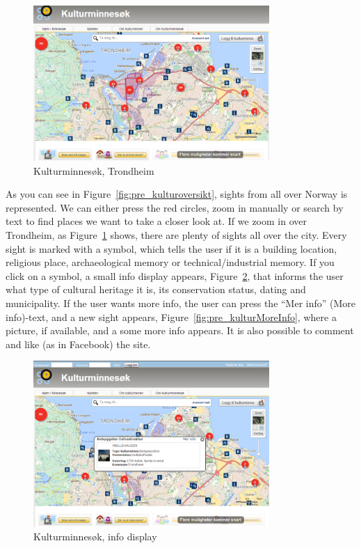 \documentclass[11pt]{book}
\begin{document}
\begin{figure}[H]
      \centering
      \includegraphics[width=0.8\textwidth]{Figures/Prestudy/kulturminnesokTrondheim.png}
      \caption{Kulturminnesøk, Trondheim}
      \label{fig:pre_kulturTrondheim}
\end{figure}

As you can see in Figure~\ref{fig:pre_kulturoversikt}, sights from all over Norway is represented. We can either press the red circles, zoom in manually or search by text to find places we want to take a closer look at. If we zoom in over Trondheim, as Figure~\ref{fig:pre_kulturTrondheim} shows, there are plenty of sights all over the city. Every sight is marked with a symbol, which tells the user if it is a building location, religious place, archaeological memory or technical/industrial memory. If you click on a symbol, a small info display appears, Figure~\ref{fig:pre_kulturInfo}, that informs the user what type of cultural heritage it is, its conservation status, dating and municipality. If the user wants more info, the user can press the ``Mer info'' (More info)-text, and  a new sight appears, Figure~\ref{fig:pre_kulturMoreInfo}, where a picture, if available, and a some more info appears. It is also possible to comment and like (as in Facebook) the site.

\begin{figure}[H]
      \centering
      \includegraphics[width=0.8\textwidth]{Figures/Prestudy/kulturminnesokClick.png}
      \caption{Kulturminnesøk, info display}
      \label{fig:pre_kulturInfo}
\end{figure}
\end{document}
